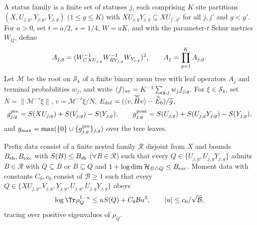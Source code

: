 \begin{definition}
    A status family is a finite set of statuses $j$, each comprising $K$ site partitions $(X,U_{j,g},Y_{j,g},V_{j,g})$ ($1\le g\le K$) with $XU_{j,g}Y_{j,g}\subseteq XU_{j',g'}$ for all $j,j'$ and $g<g'$.
    For $a>0$, set $t=a/2$, $s=1/4$, $W=aK$, and with the parameter-$t$ Schur metrics $W_Q$, define
    \begin{align}
        A_{j,g}=(W_{CXU_{j,g}}^{-1}W_{RV_{j,g}}^{-1}W_{Y_{j,g}})^2,
        \qquad A_j=\prod_{g=1}^KA_{j,g}.\notag
    \end{align}
    Let $\mathcal M$ be the root on $\mathcal S_k$ of a finite binary mean tree with leaf operators $A_j$ and terminal probabilities $w_j$, and write $\langle f\rangle_{\rm av}=K^{-1}\sum_{g,j}w_jf_{j,g}$.
    For $\xi\in\mathcal S_k$, set $N=\|\mathcal M^{-s}\xi\|$, $v=\mathcal M^{-s}\xi/N$, $E_{\rm def}=(\langle v,\overline{\widetilde H}v\rangle-\widetilde E_0)/\widetilde g$,
    \begin{align}
        g^{\rm pre}_{j,g}  =S(XU_{j,g})+S(V_{j,g})-S(Y_{j,g}),\qquad
        g^{\rm post}_{j,g} =S(U_{j,g})+S(U_{j,g}Y_{j,g})-S(Y_{j,g}), \notag
    \end{align}
    and $g_{\max}=\max(\{0\}\cup\{g^{\rm pre}_{j,g}\}_{j,g})$ over the tree leaves.

    Prefix data consist of a finite nested family $\mathcal R$ disjoint from $X$ and bounds $B_{\rm sh},B_{\rm exc}$ with $S(B)\le B_{\rm sh}$ ($\forall B\in\mathcal R$) such that every $Q\in\{U_{j,g},U_{j,g}Y_{j,g}\}$ admits $B\in\mathcal R$ with $Q\subseteq B$ or $B\subseteq Q$ and $1+\log\dim\mathcal H_{B\triangle Q}\le B_{\rm exc}$.
    Moment data with constants $C_0,c_0$ consist of $\mathcal B\ge1$ such that every $Q\in\{XU_{j,g},V_{j,g},Y_{j,g},U_{j,g},U_{j,g}Y_{j,g}\}$ obeys
    \begin{align}
        \log\Tr\rho_Q^{1-u}\le uS(Q)+C_0\mathcal Bu^2,
        \qquad |u|\le c_0/\sqrt{\mathcal B},\notag
    \end{align}
    tracing over positive eigenvalues of $\rho_Q$.


\end{definition}
